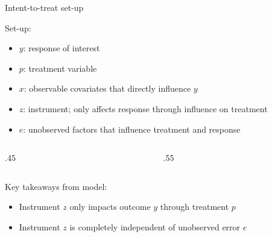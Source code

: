 \documentclass[compress, 8pt]{beamer}
\begin{document}
\begin{frame}{Intent-to-treat set-up}


Set-up:
\begin{itemize}
    \item $y$: response of interest
    \item $p$: treatment variable
    \item $x$: observable covariates that directly influence $y$
    \item $z$: instrument; only affects response through influence on treatment
    \item $e$: unobserved factors that influence treatment and response
\end{itemize}

\begin{columns}
\begin{column}{.45\textwidth}
\begin{figure}
\end{figure}
\end{column}
\begin{column}{.55\textwidth}
\begin{figure}
\end{figure}
\end{column}
\end{columns}

\vspace{3ex}
Key takeaways from model:
\begin{itemize}
    \item Instrument $z$ only impacts outcome $y$ through treatment $p$
    \item Instrument $z$ is completely independent of unobserved error $e$
\end{itemize}

\end{frame}
\end{document}
